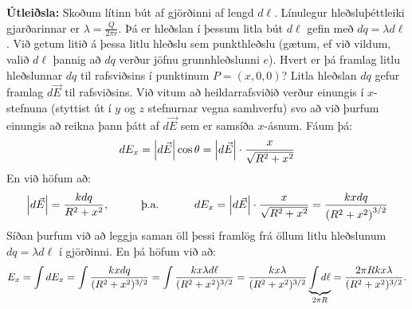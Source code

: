 \begin{figure}[H]
    \centering
\end{figure}

\textbf{Útleiðsla:} Skoðum lítinn bút af gjörðinni af lengd $d\ell$. Línulegur hleðsluþéttleiki gjarðarinnar er $\lambda = \frac{Q}{2\pi r}$. Þá er hleðslan í þessum litla bút $d\ell$ gefin með $dq = \lambda d\ell$. Við getum litið á þessa litlu hleðslu sem punkthleðslu (gætum, ef við vildum, valið $d\ell$ þannig að $dq$ verður jöfnu grunnhleðslunni $e$). Hvert er þá framlag litlu hleðslunnar $dq$ til rafsviðsins í punktinum $P = (x,0,0)$? Litla hleðslan $dq$ gefur framlag $d\vec{E}$ til rafsviðsins. Við vitum að heildarrafsviðið verður einungis í $x$-stefnuna (styttist út í $y$ og $z$ stefnurnar vegna samhverfu) svo að við þurfum einungis að reikna þann þátt af $d\vec{E}$ sem er samsíða $x$-ásnum. Fáum þá:
\begin{align*}
    dE_x = \abs{d\vec{E}} \cos\theta = \abs{d\vec{E}} \cdot \frac{x}{\sqrt{R^2 + x^2}}
\end{align*}
En við höfum að:
\begin{align*}
    \abs{d\vec{E}} = \frac{kdq}{R^2 + x^2}, \hspace{1cm} \text{þ.a.~} \hspace{1cm} dE_x = \abs{d\vec{E}} \cdot \frac{x}{\sqrt{R^2 + x^2}} = \frac{kxdq}{\left(R^2 + x^2 \right)^{3/2}}
\end{align*}
Síðan þurfum við að leggja saman öll þessi framlög frá öllum litlu hleðslunum $dq = \lambda d\ell$ í gjörðinni. En þá höfum við að:
\begin{align*}
    E_x = \int dE_x = \int \frac{kxdq}{(R^2 + x^2)^{3/2}} = \int \frac{kx\lambda d\ell}{(R^2 + x^2)^{3/2}} = \frac{kx\lambda}{(R^2 + x^2)^{3/2}} \underbrace{\int d\ell }_\textrm{$2\pi R$} = \frac{2\pi R k x \lambda}{(R^2 + x^2)^{3/2}}.
\end{align*}
  
